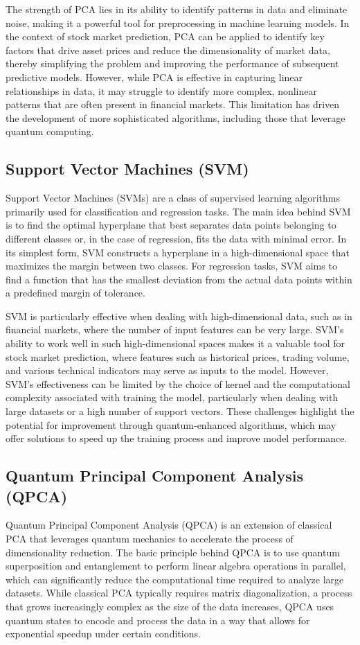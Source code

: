 \documentclass[journal]{IEEEtran}
\begin{document}
The strength of PCA lies in its ability to identify patterns in data and eliminate noise, making it a powerful tool for preprocessing in machine learning models. In the context of stock market prediction, PCA can be applied to identify key factors that drive asset prices and reduce the dimensionality of market data, thereby simplifying the problem and improving the performance of subsequent predictive models. However, while PCA is effective in capturing linear relationships in data, it may struggle to identify more complex, nonlinear patterns that are often present in financial markets. This limitation has driven the development of more sophisticated algorithms, including those that leverage quantum computing.

\subsection{Support Vector Machines (SVM)}
Support Vector Machines (SVMs) \cite{svm} are a class of supervised learning algorithms primarily used for classification and regression tasks. The main idea behind SVM is to find the optimal hyperplane that best separates data points belonging to different classes or, in the case of regression, fits the data with minimal error. In its simplest form, SVM constructs a hyperplane in a high-dimensional space that maximizes the margin between two classes. For regression tasks, SVM aims to find a function that has the smallest deviation from the actual data points within a predefined margin of tolerance.

SVM is particularly effective when dealing with high-dimensional data, such as in financial markets, where the number of input features can be very large. SVM's ability to work well in such high-dimensional spaces makes it a valuable tool for stock market prediction, where features such as historical prices, trading volume, and various technical indicators may serve as inputs to the model. However, SVM's effectiveness can be limited by the choice of kernel and the computational complexity associated with training the model, particularly when dealing with large datasets or a high number of support vectors. These challenges highlight the potential for improvement through quantum-enhanced algorithms, which may offer solutions to speed up the training process and improve model performance.

\subsection{Quantum Principal Component Analysis (QPCA)}
Quantum Principal Component Analysis (QPCA) \cite{qpca} is an extension of classical PCA that leverages quantum mechanics to accelerate the process of dimensionality reduction. The basic principle behind QPCA is to use quantum superposition and entanglement to perform linear algebra operations in parallel, which can significantly reduce the computational time required to analyze large datasets. While classical PCA typically requires matrix diagonalization, a process that grows increasingly complex as the size of the data increases, QPCA uses quantum states to encode and process the data in a way that allows for exponential speedup under certain conditions.
\end{document}
